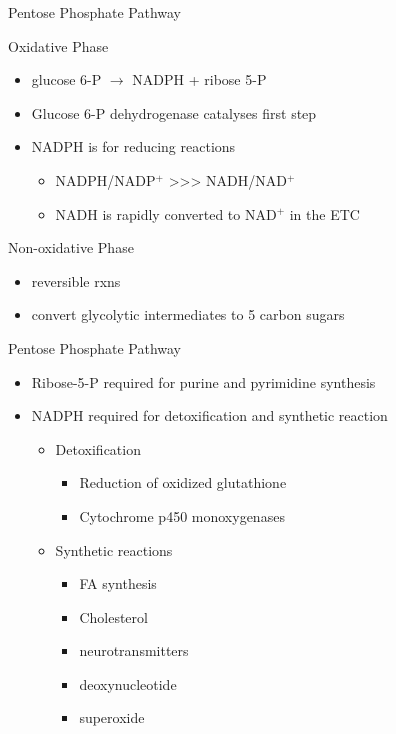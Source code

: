 \documentclass[presentation, smaller]{beamer}
\begin{document}
\begin{frame}[label={sec:org15258f3}]{Pentose Phosphate Pathway}
\begin{block}{Oxidative Phase}
\begin{itemize}
\item glucose 6-P \(\to\) NADPH + ribose 5-P
\item Glucose 6-P dehydrogenase catalyses first step
\item NADPH is for reducing reactions
\begin{itemize}
\item NADPH/NADP\(^{\text{+}}\) \textgreater{}\textgreater{}\textgreater{} NADH/NAD\(^{\text{+}}\)
\item NADH is rapidly converted to NAD\(^{\text{+}}\) in the ETC
\end{itemize}
\end{itemize}
\end{block}
\begin{block}{Non-oxidative Phase}
\begin{itemize}
\item reversible rxns
\item convert glycolytic intermediates to 5 carbon sugars
\end{itemize}
\end{block}
\end{frame}
\begin{frame}[label={sec:org6738a94}]{Pentose Phosphate Pathway}
\begin{itemize}
\item Ribose-5-P required for purine and pyrimidine synthesis
\item NADPH required for detoxification and synthetic reaction
\begin{itemize}
\item Detoxification
\begin{itemize}
\item Reduction of oxidized glutathione
\item Cytochrome p450 monoxygenases
\end{itemize}
\item Synthetic reactions
\begin{itemize}
\item FA synthesis
\item Cholesterol
\item neurotransmitters
\item deoxynucleotide
\item superoxide
\end{itemize}
\end{itemize}
\end{itemize}
\end{frame}
\end{document}

